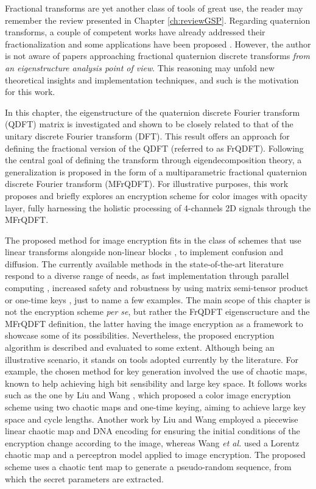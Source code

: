 Fractional transforms are yet another class of tools of great use, the reader may remember the review presented in Chapter \ref{ch:reviewGSP}. Regarding quaternion transforms, a couple of competent works have already addressed their fractionalization \cite{guanlei2008fractional, wei2013different, roopkumar2016quaternionic} and some applications have been proposed \cite{chen2018quaternion}. However, the author is not aware of papers approaching fractional quaternion discrete transforms \textit{from an eigenstructure analysis point of view}. This reasoning may unfold new theoretical insights and implementation techniques, and such is the motivation for this work.

In this chapter, the eigenstructure of the quaternion discrete Fourier transform (QDFT) matrix is investigated and shown to be closely related to that of the unitary discrete Fourier transform (DFT). This result offers an approach for defining the fractional version of the QDFT (referred to as FrQDFT). Following the central goal of defining the transform through eigendecomposition theory, a generalization is proposed in the form of a multiparametric fractional quaternion discrete Fourier transform (MFrQDFT). For illustrative purposes, this work proposes and briefly explores an encryption scheme for color images with opacity layer, fully harnessing the holistic processing of 4-channels 2D signals through the MFrQDFT.

The proposed method for image encryption fits in the class of schemes that use linear transforms alongside non-linear blocks \cite{hsue2018enhancing}, to implement confusion and diffusion. The currently available methods in the state-of-the-art literature respond to a diverse range of needs, as fast implementation through parallel computing \cite{wang2019fast}, increased safety and robustness by using matrix semi-tensor product \cite{wang2020image} or one-time keys \cite{liu2010}, just to name a few examples. The main scope of this chapter is not the encryption scheme \textit{per se}, but rather the FrQDFT eigenscructure and the MFrQDFT definition, the latter having the image encryption as a framework to showcase some of its possibilities. Nevertheless, the proposed encryption algorithm is described and evaluated to some extent. Although being an illustrative scenario, it stands on tools adopted currently by the literature. For example, the chosen method for key generation involved the use of chaotic maps, known to help achieving high bit sensibility and large key space. It follows works such as the one by Liu and Wang \cite{liu2011color}, which proposed a color image encryption scheme using two chaotic maps and one-time keying, aiming to achieve large key space and cycle lengths. Another work by Liu and Wang \cite{liu2012} employed a piecewise linear chaotic map and DNA encoding for ensuring the initial conditions of the encryption change according to the image, whereas Wang \textit{et al.} \cite{wang2010chaotic} used a Lorentz chaotic map and a perceptron model applied to image encryption. The proposed scheme uses a chaotic tent map to generate a pseudo-random sequence, from which the secret parameters are extracted.


